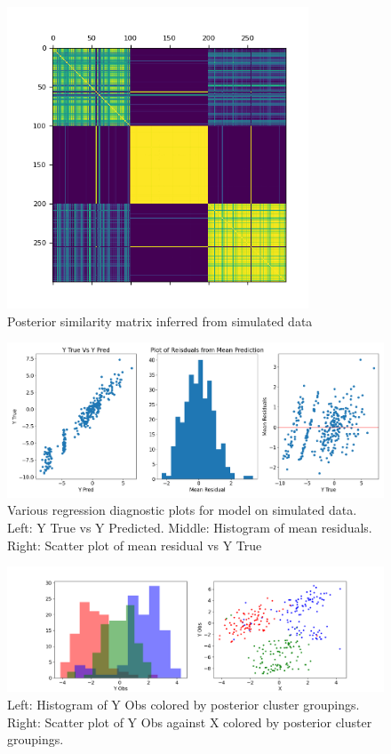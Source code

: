 \documentclass{article}
\begin{document}
\begin{appendices}
\begin{figure}[h]
  \centering
  \includegraphics[width=0.8\textwidth]{Plots/Simulated Posterior Similarity Matrix.png}
  \caption{Posterior similarity matrix inferred from simulated data}
  \label{fig:sim_post_mat}
\end{figure}

\begin{figure}[h]
  \centering
  \includegraphics[width=1\textwidth]{Plots/simuated_diagnostics.png}
  \caption{Various regression diagnostic plots for model on simulated data. Left: Y True vs Y Predicted. Middle: Histogram of mean residuals. Right: Scatter plot of mean residual vs Y True}
  \label{fig:sim_diag_plots}
\end{figure}

\begin{figure}[h]
  \centering
  \includegraphics[width=1\textwidth]{Plots/simulated_cluster_scatter.png}
  \caption{Left: Histogram of Y Obs colored by posterior cluster groupings. Right: Scatter plot of Y Obs against X colored by posterior cluster groupings.}
  \label{fig:sim_scatter_plots}
\end{figure}


\end{appendices}
\end{document}
